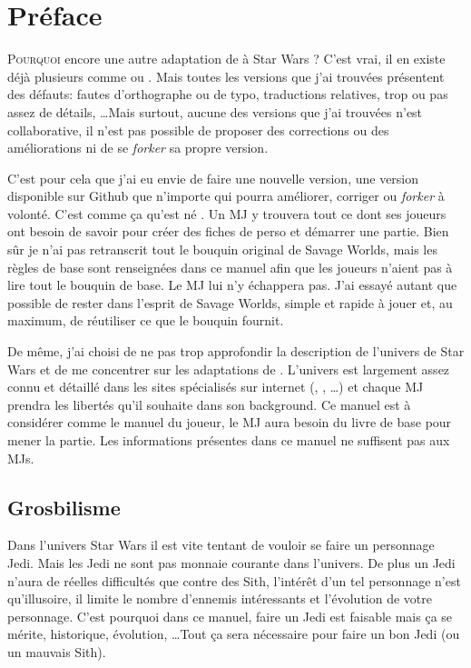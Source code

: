 \onecolumn
\section{Préface}

\lettrine{P}{ourquoi} encore une autre adaptation de  à {\jedifont Star Wars} ? C’est vrai, il en existe déjà plusieurs comme  ou . Mais toutes les versions que j’ai trouvées présentent des défauts: fautes d’orthographe ou de typo, traductions relatives, trop ou pas assez de détails, \ldots Mais surtout, aucune des versions que j’ai trouvées n’est collaborative, il n’est pas possible de proposer des corrections ou des améliorations ni de se \emph{forker} sa propre version.

C’est pour cela que j’ai eu envie de faire une nouvelle version, une version disponible sur Github que n’importe qui pourra améliorer, corriger ou \emph{forker} à volonté. C’est comme ça qu’est né {\jedifont \doctitle}. Un MJ y trouvera tout ce dont ses joueurs ont besoin de savoir pour créer des fiches de perso et démarrer une partie. Bien sûr je n’ai pas retranscrit tout le bouquin original de Savage Worlds, mais les règles de base sont renseignées dans ce manuel afin que les joueurs n’aient pas à lire tout le bouquin de base. Le MJ lui n’y échappera pas. J’ai essayé autant que possible de rester dans l’esprit de Savage Worlds, simple et rapide à jouer et, au maximum, de réutiliser ce que le bouquin fournit.

De même, j’ai choisi de ne pas trop approfondir la description de l’univers de Star Wars et de me concentrer sur les adaptations de . L’univers est largement assez connu et détaillé dans les sites spécialisés sur internet (, , \ldots) et chaque MJ prendra les libertés qu’il souhaite dans son background. Ce manuel est à considérer comme le manuel du joueur, le MJ aura besoin du livre de base  pour mener la partie. Les informations présentes dans ce manuel ne suffisent pas aux MJs.

\subsection{Grosbilisme}
Dans l’univers Star Wars il est vite tentant de vouloir se faire un personnage Jedi. Mais les Jedi ne sont pas monnaie courante dans l’univers. De plus un Jedi n’aura de réelles difficultés que contre des Sith, l’intérêt d’un tel personnage n’est qu’illusoire, il limite le nombre d’ennemis intéressants et l’évolution de votre personnage. C’est pourquoi dans ce manuel, faire un Jedi est faisable mais ça se mérite, historique, évolution, \ldots Tout ça sera nécessaire pour faire un bon Jedi (ou un mauvais Sith).

